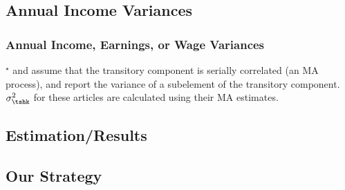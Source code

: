 \subsection{Annual Income Variances}
\begin{frame}
\frametitle{{Annual Income, Earnings, or Wage Variances}}

\begin{scriptsize}


\tiny{$^{\star}$\citet{meghir&pistaferri} and \citet{bppInequality} assume that the transitory component is serially correlated (an MA process), and report the variance of a subelement of the transitory component. $\sigma_{\tshk}^{2}$ for these articles are calculated using their MA estimates. }
\end{scriptsize}

\end{frame}



\subsection{Estimation/Results}


\subsection{Our Strategy}



